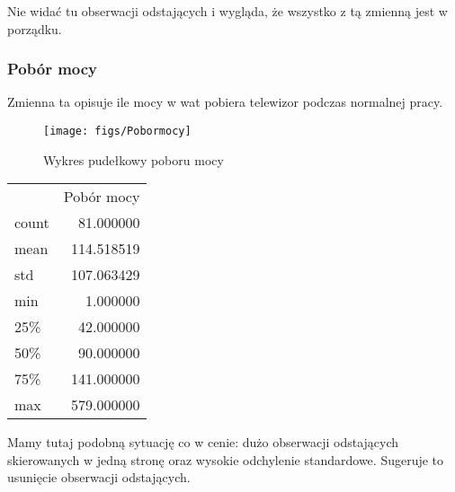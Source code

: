 \documentclass[11pt,a4paper]{article}
\begin{document}
			Nie widać tu obserwacji odstających i wygląda, że wszystko z tą zmienną jest w porządku.
		
		\subsubsection{Pobór mocy}
			Zmienna ta opisuje ile mocy w wat pobiera telewizor podczas normalnej pracy.
			\begin{figure}[h]
				\centering
				\texttt{[image: figs/Pobormocy]}
				\caption[Pobormocy]{Wykres pudełkowy poboru mocy}
				\label{fig:Pobormocy}
			\end{figure}
			\begin{center}
				\begin{tabular}{lr}
					 
					{} &  Pobór mocy \\
					 
					count &   81.000000 \\
					mean  &  114.518519 \\
					std   &  107.063429 \\
					min   &    1.000000 \\
					25\%   &   42.000000 \\
					50\%   &   90.000000 \\
					75\%   &  141.000000 \\
					max   &  579.000000 \\
					 
				\end{tabular}
			\end{center}
			Mamy tutaj podobną sytuację co w cenie: dużo obserwacji odstających skierowanych w jedną stronę
			oraz wysokie odchylenie standardowe. Sugeruje to usunięcie obserwacji odstających. 
\end{document}
